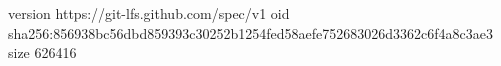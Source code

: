 version https://git-lfs.github.com/spec/v1
oid sha256:856938bc56dbd859393c30252b1254fed58aefe752683026d3362c6f4a8c3ae3
size 626416
